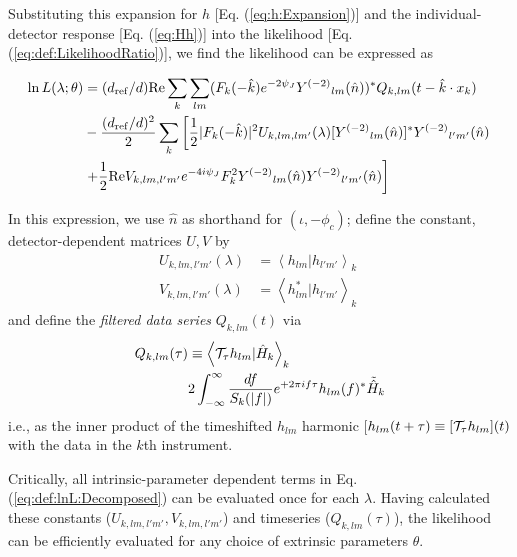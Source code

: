 \documentclass[twocolumn,prd,nofootinbib]{revtex4}
\newcommand\Y[1]{Y^{(#1)}{}}
\newcommand\qmstateproduct[2]{\left\langle#1|#2\right\rangle}
\begin{document}
Substituting this expansion for $h$ [Eq. (\ref{eq:h:Expansion})] and the individual-detector response
[Eq. (\ref{eq:Hh})] into the
likelihood [Eq. (\ref{eq:def:LikelihoodRatio})], we find the likelihood can be expressed as
\begin{widetext}
\begin{align}
\ln L(\lambda; \theta) 
&= (d_{\rm ref}/d) \text{Re} \sum_k \sum_{lm}(F_k(-\hat{k}) e^{-2\psi_J} \Y{-2}_{lm}(\hat{n}))^* Q_{k,lm}(t-\hat{k}\cdot
x_k)
\nonumber \\
&   -\frac{(d_{\rm ref}/d)^2}{2}\sum_k
\left[
{
 \frac{1}{2}|F_k(-\hat{k})|^2 U_{k,lm,lm'}(\lambda)[\Y{-2}_{lm}(\hat{n})]^*\Y{-2}_{l'm'}(\hat{n})
}
 \right. \nonumber \\ & \left.
 {
+
 \frac{1}{2} \text{Re} V_{k,lm,l'm'} e^{-4i\psi_J}F_k^2 \Y{-2}_{lm}(\hat{n})\Y{-2}_{l'm'}(\hat{n})
}
\right]
\label{eq:def:lnL:Decomposed}
\end{align}
\end{widetext}
In this expression, we use $\hat{n}$ as shorthand for $(\iota,-\phi_c)$; define the constant, detector-dependent
matrices $U,V$ by 
\begin{subequations}
\label{eq:ComputeRhoViaInnerProductMatrix}
\begin{align}
{ U_{k,lm,l'm'}(\lambda)}& = \qmstateproduct{h_{lm}}{h_{l'm'}}_k \\
V_{k,lm,l'm'}(\lambda)& = \qmstateproduct{h_{lm}^*}{h_{l'm'}}_k  \;
\end{align}
\end{subequations}
and define the \emph{filtered data series} $Q_{k,lm}(t)$ via 
\begin{align}
Q_{k,lm}(\tau) &\equiv \qmstateproduct{{\cal T}_{\tau} h_{lm}}{\hat{H}_k}_k \\
& 2 \int_{-\infty}^{\infty} \frac{df}{S_k(|f|)} e^{+2\pi i f \tau} h_{lm}(f)^* \tilde{\hat{H}}_k \\
\end{align}
i.e., as the inner product of the timeshifted $h_{lm}$ harmonic [$h_{lm}(t+\tau)\equiv [{\cal T}_\tau h_{lm}](t)$ with the data in the $k$th instrument.


Critically, all intrinsic-parameter dependent terms in   Eq. (\ref{eq:def:lnL:Decomposed}) can be evaluated once for
each $\lambda$.  Having calculated these constants ($U_{k,lm,l'm'},V_{k,lm,l'm'}$) and timeseries ($Q_{k,lm}(\tau)$),
the likelihood can be efficiently evaluated for any choice of extrinsic parameters $\theta$.
%
\end{document}
